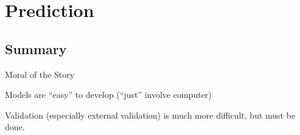 \documentclass[
  12pt,
  ignorenonframetext,
]{beamer}
\begin{document}
\hypertarget{prediction-1}{%
\section{Prediction}\label{prediction-1}}

\hypertarget{summary}{%
\subsection{Summary}\label{summary}}

\begin{frame}{Moral of the Story}
\protect\hypertarget{moral-of-the-story}{}

Models are ``easy'' to develop (``just'' involve computer)

Validation (especially external validation) is much more difficult, but
must be done.

\end{frame}
\end{document}
